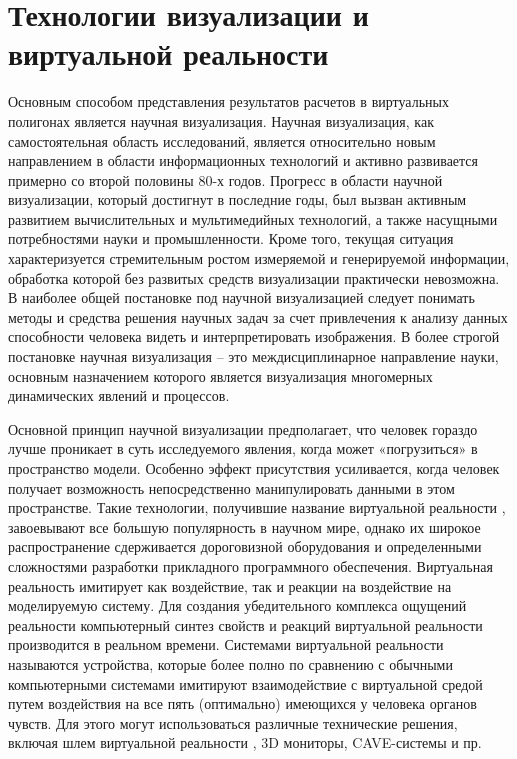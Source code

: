 \section{Технологии визуализации и виртуальной реальности }

Основным способом представления результатов расчетов в виртуальных полигонах является научная визуализация.
Научная визуализация, как самостоятельная область исследований, является относительно новым направлением в области информационных технологий и активно развивается примерно со второй половины 80-х годов. Прогресс в области научной визуализации, который достигнут в последние годы, был вызван активным развитием вычислительных и мультимедийных технологий, а также насущными потребностями науки и промышленности. Кроме того, текущая ситуация характеризуется стремительным ростом измеряемой и генерируемой информации, обработка которой без развитых средств визуализации практически невозможна. В наиболее общей постановке под научной визуализацией следует понимать методы и средства решения научных задач за счет привлечения к анализу данных способности человека видеть и интерпретировать изображения. В более строгой постановке научная визуализация – это междисциплинарное направление науки, основным назначением которого является визуализация многомерных динамических явлений и процессов.

Основной принцип научной визуализации предполагает, что человек гораздо лучше проникает в суть исследуемого явления, когда может «погрузиться» в пространство модели. Особенно эффект присутствия усиливается, когда человек получает возможность непосредственно манипулировать данными в этом пространстве. Такие технологии, получившие название виртуальной реальности \citep{dk51}\citep{dk52}, завоевывают все большую популярность в научном мире, однако их широкое распространение сдерживается дороговизной оборудования и определенными сложностями разработки прикладного программного обеспечения. Виртуальная реальность имитирует как воздействие, так и реакции на воздействие на моделируемую систему. Для создания убедительного комплекса ощущений реальности компьютерный синтез свойств и реакций виртуальной реальности производится в реальном времени. Системами виртуальной реальности называются устройства, которые более полно по сравнению с обычными компьютерными системами имитируют взаимодействие с виртуальной средой путем воздействия на все пять (оптимально) имеющихся у человека органов чувств. Для этого могут использоваться различные технические решения, включая шлем виртуальной реальности \citep{dk53}, 3D мониторы, CAVE-системы \citep{dk54} и пр.


